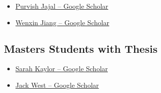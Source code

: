 
\begin{itemize}
	\item \href{https://scholar.google.com/citations?user=G43a2fwAAAAJ&hl=en}{Purvish Jajal -- Google Scholar}

\end{itemize}


\begin{itemize}
\item \href{https://scholar.google.com/citations?user=skZNwokAAAAJ&hl=en}{Wenxin Jiang -- Google Scholar}
\end{itemize}


\subsection{Masters Students with Thesis}

\begin{itemize}
	\item \href{https://scholar.google.com/citations?user=GkE3YPQAAAAJ&hl=en}{Sarah Kaylor -- Google Scholar}
\end{itemize}


\begin{itemize}
	\item \href{https://scholar.google.com/citations?user=SPvs1hsAAAAJ&hl=en}{Jack West -- Google Scholar}
\end{itemize}

